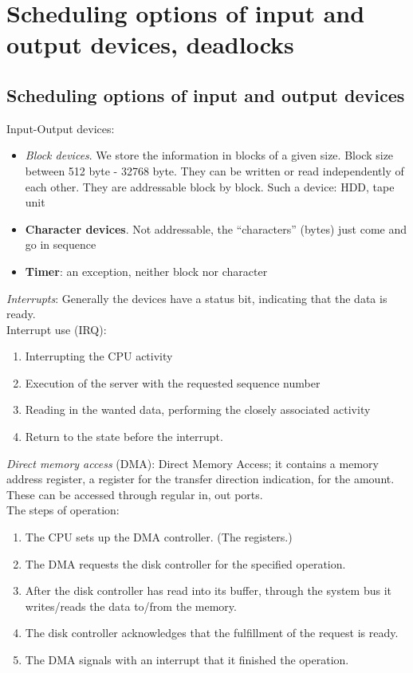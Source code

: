 \documentclass[margin=0px]{article}
\begin{document}
\section{Scheduling options of input and output devices, deadlocks}

\subsection{Scheduling options of input and output devices}

Input-Output devices:
\begin{itemize}
    \item \textit{Block devices}. We store the information in blocks of a given size. Block size between 512 byte - 32768 byte. They can be written or read independently of each other. They are addressable block by block. Such a device: HDD, tape unit
    \item \textbf{Character devices}. Not addressable, the ``characters'' (bytes) just come and go in sequence
    \item \textbf{Timer}: an exception, neither block nor character
\end{itemize}
\textit{Interrupts}: Generally the devices have a status bit, indicating that the data is ready. \\
Interrupt use (IRQ):
\begin{enumerate}
    \item Interrupting the CPU activity
    \item Execution of the server with the requested sequence number
    \item Reading in the wanted data, performing the closely associated activity
    \item Return to the state before the interrupt.
\end{enumerate}
\textit{Direct memory access} (DMA): Direct Memory Access; it contains a memory address register, a register for the transfer direction indication, for the amount. These can be accessed through regular in, out ports. \\
The steps of operation:
\begin{enumerate}
    \item The CPU sets up the DMA controller. (The registers.)
    \item The DMA requests the disk controller for the specified operation.
    \item After the disk controller has read into its buffer, through the system bus it writes/reads the data to/from the memory.
    \item The disk controller acknowledges that the fulfillment of the request is ready.
    \item The DMA signals with an interrupt that it finished the operation.
\end{enumerate}
\end{document}
